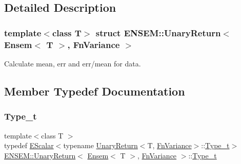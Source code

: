 \subsection{Detailed Description}
\subsubsection*{template$<$class T$>$\newline
struct E\+N\+S\+E\+M\+::\+Unary\+Return$<$ Ensem$<$ T $>$, Fn\+Variance $>$}

Calculate mean, err and err/mean for data. 

\subsection{Member Typedef Documentation}
\mbox{\label{structENSEM_1_1UnaryReturn_3_01Ensem_3_01T_01_4_00_01FnVariance_01_4_ab460044d5646089e41eebeb2f5be9f33}} 
\subsubsection{\texorpdfstring{Type\_t}{Type\_t}\hspace{0.1cm}{\footnotesize\ttfamily [1/3]}}
{\footnotesize\ttfamily template$<$class T $>$ \\
typedef \mbox{\hyperlink{classENSEM_1_1EScalar}{E\+Scalar}}$<$typename \mbox{\hyperlink{structENSEM_1_1UnaryReturn}{Unary\+Return}}$<$T, \mbox{\hyperlink{structENSEM_1_1FnVariance}{Fn\+Variance}}$>$\+::\mbox{\hyperlink{structENSEM_1_1UnaryReturn_3_01Ensem_3_01T_01_4_00_01FnVariance_01_4_ab460044d5646089e41eebeb2f5be9f33}{Type\+\_\+t}}$>$ \mbox{\hyperlink{structENSEM_1_1UnaryReturn}{E\+N\+S\+E\+M\+::\+Unary\+Return}}$<$ \mbox{\hyperlink{classENSEM_1_1Ensem}{Ensem}}$<$ T $>$, \mbox{\hyperlink{structENSEM_1_1FnVariance}{Fn\+Variance}} $>$\+::\mbox{\hyperlink{structENSEM_1_1UnaryReturn_3_01Ensem_3_01T_01_4_00_01FnVariance_01_4_ab460044d5646089e41eebeb2f5be9f33}{Type\+\_\+t}}}

\mbox{\label{structENSEM_1_1UnaryReturn_3_01Ensem_3_01T_01_4_00_01FnVariance_01_4_ab460044d5646089e41eebeb2f5be9f33}} 

